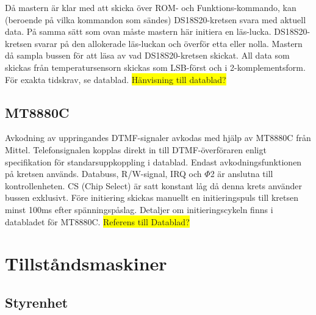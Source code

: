 \documentclass[a4paper,11pt]{article}
\begin{document}
		Då mastern är klar med att skicka över ROM- och Funktions-kommando, kan (beroende på vilka kommandon som sändes) DS18S20-kretsen
		svara med aktuell data. På samma sätt som ovan måste mastern här initiera en läs-lucka. 
		DS18S20-kretsen svarar på den allokerade läs-luckan och överför etta eller nolla. Mastern då sampla bussen för att läsa av vad DS18S20-kretsen skickat. All data som skickas från
		temperatursensorn skickas som LSB-först och i 2-komplementsform. För exakta tidskrav, se datablad.
		\colorbox{yellow}{Hänvisning till datablad?}\\

	\subsection{MT8880C}
	\label{MT8880C}
		Avkodning av uppringandes DTMF-signaler avkodas med hjälp av MT8880C från Mittel. 
		Telefonsignalen kopplas direkt in till DTMF-överföraren enligt specifikation för standarsuppkoppling i datablad. Endast avkodningsfunktionen på 		kretsen används. Databuss, R/W-signal, IRQ och $\Phi$2 är anslutna till kontrollenheten. 
		CS (Chip Select) är satt konstant låg då denna krets använder bussen exklusivt. 
Före initiering skickas manuellt en initieringspuls till kretsen minst 100ms efter spänningspåslag. Detaljer om initieringscykeln finns i databladet för MT8880C.
\colorbox{yellow}{Referens till Datablad?} \\

\section{Tillståndsmaskiner}
\label{sec:Tillstandsmaskiner}		
\subsection{Styrenhet}
\end{document}
